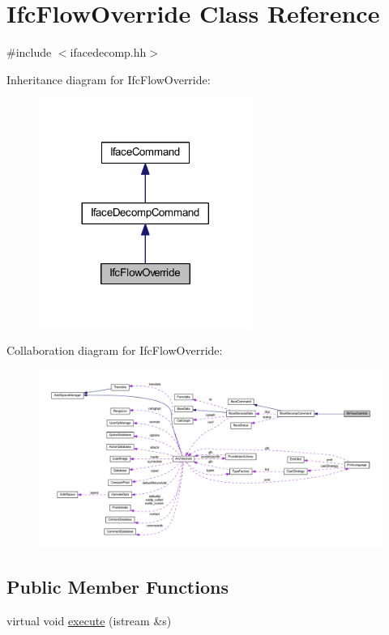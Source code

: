 \hypertarget{class_ifc_flow_override}{}\section{Ifc\+Flow\+Override Class Reference}
\label{class_ifc_flow_override}


{\ttfamily \#include $<$ifacedecomp.\+hh$>$}



Inheritance diagram for Ifc\+Flow\+Override\+:
\nopagebreak
\begin{figure}[H]
\begin{center}
\leavevmode
\includegraphics[width=197pt]{class_ifc_flow_override__inherit__graph}
\end{center}
\end{figure}


Collaboration diagram for Ifc\+Flow\+Override\+:
\nopagebreak
\begin{figure}[H]
\begin{center}
\leavevmode
\includegraphics[width=350pt]{class_ifc_flow_override__coll__graph}
\end{center}
\end{figure}
\subsection*{Public Member Functions}
\begin{DoxyCompactItemize}
\item 
virtual void \mbox{\hyperlink{class_ifc_flow_override_a7bb5fdc69ea21e9236a4e015a39c9dac}{execute}} (istream \&s)
\end{DoxyCompactItemize}
